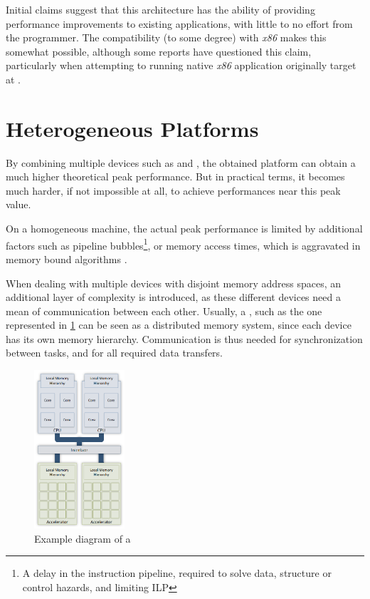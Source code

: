 \documentclass[main.tex]{subfiles}
\begin{document}
Initial claims suggest that this architecture has the ability of providing performance improvements to existing applications, with little to no effort from the programmer. The compatibility (to some degree) with \textit{x86} makes this somewhat possible, although some reports have questioned this claim, particularly when attempting to running native \textit{x86} application originally target at \xeon \cpus\cite{MIC:Nvidia}.


\section{Heterogeneous Platforms}

By combining multiple devices such as \cpus and \gpus, the obtained platform can obtain a much higher theoretical peak performance. But in practical terms, it becomes much harder, if not impossible at all, to achieve performances near this peak value.

On a homogeneous machine, the actual peak performance is limited by additional factors such as pipeline bubbles\footnote{A delay in the instruction pipeline, required to solve data, structure or control hazards, and limiting \ac{ILP} }, or memory access times, which is aggravated in memory bound algorithms \cite{williams2009roofline}.

When dealing with multiple devices with disjoint memory address spaces, an additional layer of complexity is introduced, as these different devices need a mean of communication between each other. Usually, a \hetplat, such as the one represented in \cref{fig:hetplat} can be seen as a distributed memory system, since each device has its own memory hierarchy. Communication is thus needed for synchronization between tasks, and for all required data transfers.

\begin{figure}[!htp]
  \centering
  \includegraphics[width=0.3\textwidth]{visio/hetplats}
  \caption{Example diagram of a \hetplat \label{fig:hetplat}}
\end{figure}
\end{document}
